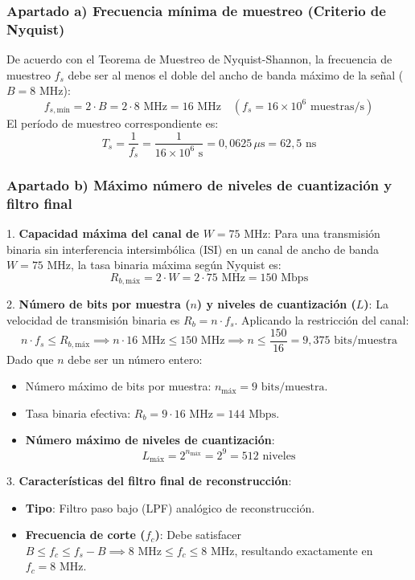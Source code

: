 \begin{resolucion}
\subsubsection*{Apartado a) Frecuencia mínima de muestreo (Criterio de Nyquist)}

De acuerdo con el Teorema de Muestreo de Nyquist-Shannon, la frecuencia de muestreo $f_s$ debe ser al menos el doble del ancho de banda máximo de la señal ($B = 8\text{ MHz}$):
\[
f_{s, \text{mín}} = 2 \cdot B = 2 \cdot 8\text{ MHz} = 16\text{ MHz} \quad \left(f_s = 16 \times 10^6 \text{ muestras/s}\right)
\]
El período de muestreo correspondiente es:
\[
T_s = \frac{1}{f_s} = \frac{1}{16 \times 10^6\text{ s}} = 0{,}0625 \, \mu\text{s} = 62{,}5\text{ ns}
\]

\subsubsection*{Apartado b) Máximo número de niveles de cuantización y filtro final}

1. \textbf{Capacidad máxima del canal de $W = 75\text{ MHz}$}:
   Para una transmisión binaria sin interferencia intersimbólica (ISI) en un canal de ancho de banda $W = 75\text{ MHz}$, la tasa binaria máxima según Nyquist es:
   \[
   R_{b, \text{máx}} = 2 \cdot W = 2 \cdot 75\text{ MHz} = 150\text{ Mbps}
   \]

2. \textbf{Número de bits por muestra ($n$) y niveles de cuantización ($L$)}:
   La velocidad de transmisión binaria es $R_b = n \cdot f_s$. Aplicando la restricción del canal:
   \[
   n \cdot f_s \le R_{b, \text{máx}} \implies n \cdot 16\text{ MHz} \le 150\text{ MHz} \implies n \le \frac{150}{16} = 9{,}375\text{ bits/muestra}
   \]
   Dado que $n$ debe ser un número entero:
   \begin{itemize}
       \item Número máximo de bits por muestra: $n_{\text{máx}} = 9\text{ bits/muestra}$.
       \item Tasa binaria efectiva: $R_b = 9 \cdot 16\text{ MHz} = 144\text{ Mbps}$.
       \item \textbf{Número máximo de niveles de cuantización}:
         \[
         L_{\text{máx}} = 2^{n_{\text{máx}}} = 2^9 = 512\text{ niveles}
         \]
   \end{itemize}

3. \textbf{Características del filtro final de reconstrucción}:
   \begin{itemize}
       \item \textbf{Tipo}: Filtro paso bajo (LPF) analógico de reconstrucción.
       \item \textbf{Frecuencia de corte ($f_c$)}: Debe satisfacer $B \le f_c \le f_s - B \implies 8\text{ MHz} \le f_c \le 8\text{ MHz}$, resultando exactamente en $f_c = 8\text{ MHz}$.
   \end{itemize}


\end{resolucion}
